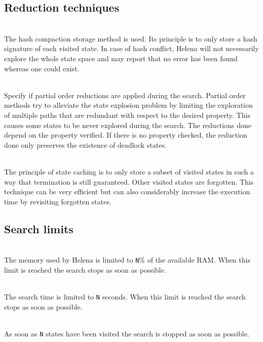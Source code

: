 \subsection{Reduction techniques}
\begin{description}
\item{}\\ The hash compaction storage
  method is used.  Its principle is to only store a hash signature of
  each visited state.  In case of hash conflict, Helena will not
  necessarily explore the whole state space and may report that no
  error has been found whereas one could exist.
\item{}\\ Specify if partial order
  reductions are applied during the search.  Partial order methods try
  to alleviate the state explosion problem by limiting the exploration
  of multiple paths that are redundant with respect to the desired
  property.  This causes some states to be never explored during the
  search.  The reductions done depend on the property verified.  If
  there is no property checked, the reduction done only preserves the
  existence of deadlock states.
\item{}\\ The principle of state caching is
  to only store a subset of visited states in such a way that
  termination is still guaranteed.  Other visited states are
  forgotten.  This technique can be very efficient but can also
  considerably increase the execution time by revisiting forgotten
  states.
\end{description}

\subsection{Search limits}
\label{subsection:limits}
\begin{description}
\item{}\\ The memory used by Helena is
  limited to \texttt{N}\% of the available RAM.  When this limit is
  reached the search stops as soon as possible.
\item{}\\ The search time is limited to
  \texttt{N} seconds.  When this limit is reached the search stops as
  soon as possible.
\item{}\\ As soon as \texttt{N} states
  have been visited the search is stopped as soon as possible.
\end{description}


